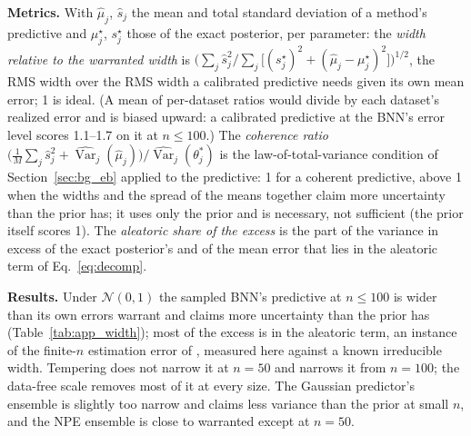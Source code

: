 \documentclass[11pt]{article}
\begin{document}
\textbf{Metrics.} With $\hat\mu_j$, $\hat s_j$ the mean and total standard deviation of a method's predictive and
$\mu^\star_j$, $s^\star_j$ those of the exact posterior, per parameter: the \emph{width relative to the warranted width}
is $\big(\sum_j\hat s_j^2\big/\sum_j\big[(s^\star_j)^2+(\hat\mu_j-\mu^\star_j)^2\big]\big)^{1/2}$, the RMS width over the RMS
width a calibrated predictive needs given its own mean error; 1 is ideal. (A mean of per-dataset ratios would divide by
each dataset's realized error and is biased upward: a calibrated predictive at the BNN's error level scores 1.1--1.7 on
it at $n\le100$.) The \emph{coherence ratio} $\big(\frac1M\sum_j\hat s_j^2+\widehat{\operatorname{Var}}_j(\hat\mu_j)\big)
\big/\widehat{\operatorname{Var}}_j(\theta^\ast_j)$ is the law-of-total-variance condition of Section~\ref{sec:bg_eb}
applied to the predictive: 1 for a coherent predictive, above 1 when the widths and the spread of the means together
claim more uncertainty than the prior has; it uses only the prior and is necessary, not sufficient (the prior itself
scores 1). The \emph{aleatoric share of the excess} is the part of the variance in excess of the exact posterior's and of
the mean error that lies in the aleatoric term of Eq.~\eqref{eq:decomp}.

\textbf{Results.}
Under $\mathcal N(0,1)$ the sampled BNN's predictive at $n\le100$ is wider than its own errors warrant and claims more
uncertainty than the prior has (Table~\ref{tab:app_width}); most of the excess is in the aleatoric term, an instance of the
finite-$n$ estimation error of \citet{bickfordsmith2025rethinking}, measured here against a known irreducible width. Tempering does
not narrow it at $n=50$ and narrows it from $n=100$; the data-free scale removes most of it at every size. The
Gaussian predictor's ensemble is slightly too narrow and claims less variance than the prior at small $n$, and the NPE
ensemble is close to warranted except at $n=50$.

\begin{table}[p]
\centering
\small\setlength{\tabcolsep}{3.5pt}
\caption{Width metrics defined above, mean over repeats, $\sigma$ / $\rho$. Width over warranted width: RMS width over the RMS width a calibrated predictive needs given its own mean error. Coherence ratio: (mean predicted variance $+$ variance of the predicted mean) / variance of $\theta^*$ over the test set. Aleatoric share: of the variance in excess of the exact posterior's and of the mean error, the part in the aleatoric term, for the two BNNs with an excess (undefined where width / warranted $\approx1$, so not shown at $n\ge5{,}000$).}
\label{tab:app_width}
\end{table}
\end{document}
